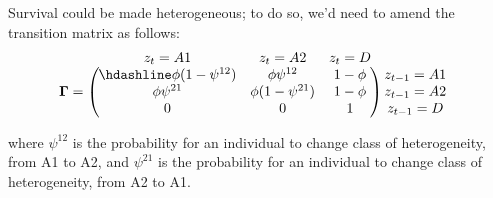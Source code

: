 \documentclass[
  12pt,
]{krantz}
\begin{document}
Survival could be made heterogeneous; to do so, we'd need to amend the transition matrix as follows:
\[\begin{matrix}
& \\
\mathbf{\Gamma} =
  \left ( \vphantom{ \begin{matrix} 12 \\ 12 \\ 12 \end{matrix} } \right .
          \end{matrix}
          \hspace{-1.2em}
          \begin{matrix}
          z_t=A1 & z_t=A2 & z_t=D \\ \hdashline
          \phi (1-\psi^{12}) & \phi \psi^{12} & 1 - \phi\\
          \phi \psi^{21} & \phi (1-\psi^{21}) & 1 - \phi\\
          0 & 0 & 1
          \end{matrix}
          \hspace{-0.2em}
          \begin{matrix}
          & \\
          \left . \vphantom{ \begin{matrix} 12 \\ 12 \\ 12 \end{matrix} } \right )
\begin{matrix}
z_{t-1}=A1 \\ z_{t-1}=A2 \\ z_{t-1}=D
\end{matrix}
\end{matrix}\]

where \(\psi^{12}\) is the probability for an individual to change class of heterogeneity, from A1 to A2, and \(\psi^{21}\) is the probability for an individual to change class of heterogeneity, from A2 to A1.
\end{document}
